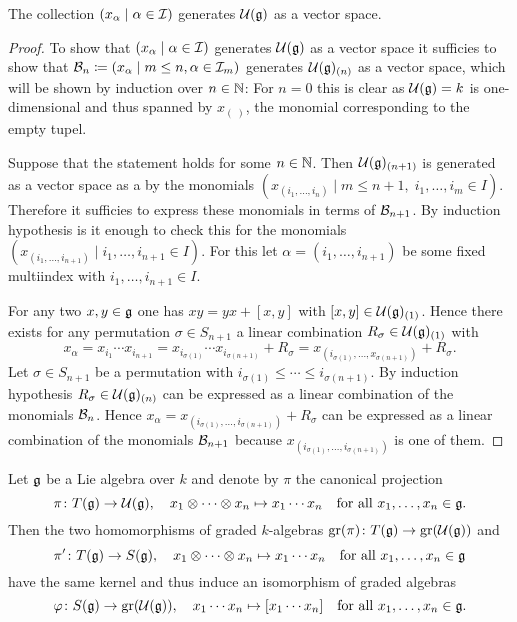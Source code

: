 \begin{lem}
 The collection $(x_\alpha \mid \alpha \in \mathcal{I})$ generates $\mathcal{U}(\mathfrak{g})$ as a vector space.
\end{lem}
\begin{proof}
 To show that $(x_\alpha \mid \alpha \in \mathcal{I})$ generates $\mathcal{U}(\mathfrak{g})$ as a vector space it sufficies to show that $\mathcal{B}_n \coloneqq (x_\alpha \mid m \leq n, \alpha \in \mathcal{I}_m)$ generates $\mathcal{U}(\mathfrak{g})_{(n)}$ as a vector space, which will be shown by induction over $n \in \mathbb{N}$: For $n = 0$ this is clear as $\mathcal{U}(\mathfrak{g}) = k$ is one-dimensional and thus spanned by $x_{(\;)}$, the monomial corresponding to the empty tupel.
 
 Suppose that the statement holds for some $n \in \mathbb{N}$. Then $\mathcal{U}(\mathfrak{g})_{(n+1)}$ is generated as a vector space as a by the monomials $(x_{(i_1, \dotsc, i_n)} \mid m \leq n+1, \; i_1, \dotsc, i_m \in I)$. Therefore it sufficies to express these monomials in terms of $\mathcal{B}_{n+1}$. By induction hypothesis is it enough to check this for the monomials $(x_{(i_1, \dotsc, i_{n+1})} \mid i_1, \dotsc, i_{n+1} \in I)$. For this let $\alpha = (i_1, \dotsc, i_{n+1})$ be some fixed multiindex with $i_1, \dotsc, i_{n+1} \in I$.
 
 For any two $x,y \in \mathfrak{g}$ one has $xy = yx + [x,y]$ with $[x,y] \in \mathcal{U}(\mathfrak{g})_{(1)}$. Hence there exists for any permutation $\sigma \in S_{n+1}$ a linear combination $R_\sigma \in \mathcal{U}(\mathfrak{g})_{(1)}$ with
 \[
  x_\alpha
  = x_{i_1} \dotsm x_{i_{n+1}}
  = x_{i_{\sigma(1)}} \dotsm x_{i_{\sigma(n+1)}} + R_\sigma
  = x_{(i_{\sigma(1)}, \dotsc, x_{\sigma(n+1)})} + R_\sigma.
 \]
 Let $\sigma \in S_{n+1}$ be a permutation with $i_{\sigma(1)} \leq \dotsb \leq i_{\sigma(n+1)}$. By induction hypothesis $R_\sigma \in \mathcal{U}(\mathfrak{g})_{(n)}$ can be expressed as a linear combination of the monomials $\mathcal{B}_n$. Hence $x_\alpha = x_{(i_{\sigma(1)}, \dotsc, i_{\sigma(n+1)})} + R_\sigma$ can be expressed as a linear combination of the monomials $\mathcal{B}_{n+1}$ because $x_{(i_{\sigma(1)}, \dotsc, i_{\sigma(n+1)})}$ is one of them.
\end{proof}


\begin{thrm} \label{thrm: pbw abstract}
 Let $\mathfrak{g}$ be a Lie algebra over $k$ and denote by $\pi$ the canonical projection
 \[
  \pi \colon T(\mathfrak{g}) \to \mathcal{U}(\mathfrak{g}), \quad
  x_1 \otimes \dotsb \otimes x_n \mapsto x_1 \dotsm x_n
  \quad \text{for all $x_1, \dotsc, x_n \in \mathfrak{g}$}.
 \]
 Then the two homomorphisms of graded $k$-algebras $\operatorname{gr}(\pi) \colon T(\mathfrak{g}) \to \operatorname{gr}(\mathcal{U}(\mathfrak{g}))$ and
 \[
  \pi' \colon T(\mathfrak{g}) \to S(\mathfrak{g}), \quad 
  x_1 \otimes \dotsb \otimes x_n \mapsto x_1 \dotsm x_n
  \quad \text{for all $x_1, \dotsc, x_n \in \mathfrak{g}$}
 \]
 have the same kernel and thus induce an isomorphism of graded algebras
 \begin{equation}\label{eqn: induced isomorphism of graded algebras}
  \varphi \colon S(\mathfrak{g}) \to \operatorname{gr}(\mathcal{U}(\mathfrak{g})), \quad
  x_1 \dotsm x_n \mapsto [x_1 \dotsm x_n]
  \quad \text{for all $x_1, \dotsc, x_n \in \mathfrak{g}$}.
 \end{equation}
\end{thrm}



